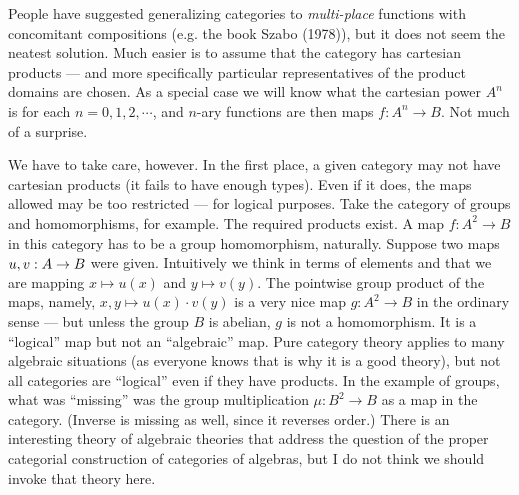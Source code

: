 People have suggested generalizing categories to {\it multi-place} functions with
concomitant compositions (e.g. the book Szabo (1978)), but it does not seem the neatest
solution. Much easier is to assume that the category has cartesian products --- and more
specifically particular representatives of the product domains are chosen. As a special
case we will know what the cartesian power $A^n$ is for each $n=0,1,2,\cdots$, and $n$-ary
functions are then maps $f: A^n\to B$. Not much of a surprise.

We have to take care, however. In the first place, a given category may not have cartesian
products (it fails to have enough types). Even if it does, the maps allowed may be too
restricted --- for logical purposes. Take the category of groups and homomorphisms, for
example. The required products exist. A map $f : A^2 \to B$ in this category has to be a
group homomorphism, naturally. Suppose two maps $u,v: A \rightarrow B$ were given. Intuitively we
think in terms of elements and that we are mapping $x \mapsto u(x)$ and $y \mapsto v(y)$.
The pointwise group product of the maps, namely, $x,y \mapsto  u(x) \cdot v(y)$ is a very
nice map $g : A^2 \to B$ in the ordinary sense --- but unless the group $B$ is abelian,
$g$ is not a homomorphism. It is a ``logical'' map but not an ``algebraic'' map. Pure
category theory applies to many algebraic situations (as everyone knows that is why it is
a good theory), but not all categories are ``logical'' even if they have products. In the
example of groups, what was ``missing'' was the group multiplication $\mu: B^2 \to B$ as a
map in the category. (Inverse is missing as well, since it reverses order.) There is an
interesting theory of algebraic theories that address the question of the proper
categorial construction of categories of algebras, but I do not think we should invoke
that theory here.

